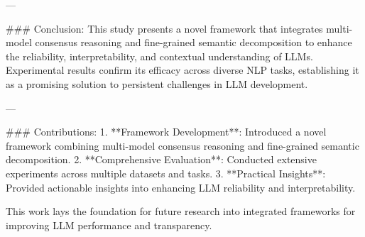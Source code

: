 ---

### Conclusion:
This study presents a novel framework that integrates multi-model consensus reasoning and fine-grained semantic decomposition to enhance the reliability, interpretability, and contextual understanding of LLMs. Experimental results confirm its efficacy across diverse NLP tasks, establishing it as a promising solution to persistent challenges in LLM development.

---

### Contributions:
1. **Framework Development**: Introduced a novel framework combining multi-model consensus reasoning and fine-grained semantic decomposition.
2. **Comprehensive Evaluation**: Conducted extensive experiments across multiple datasets and tasks.
3. **Practical Insights**: Provided actionable insights into enhancing LLM reliability and interpretability.

This work lays the foundation for future research into integrated frameworks for improving LLM performance and transparency.